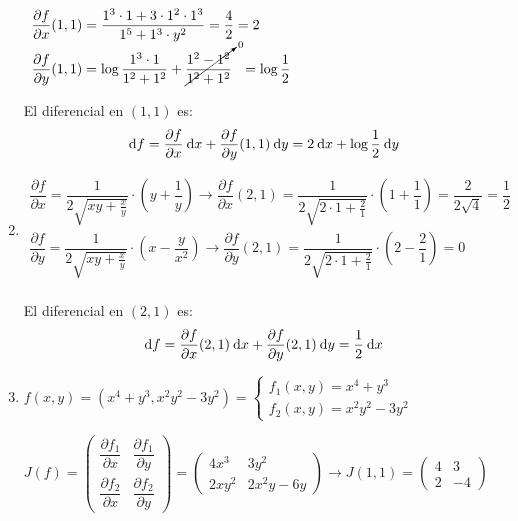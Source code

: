 \begin{enumerate}[label=\color{red}\textbf{\arabic*)}, leftmargin=*]
$\begin{array}{l}
\dfrac{\partial f}{\partial x}(1,1)=\dfrac{1^{3}\cdot1+3\cdot1^{2}\cdot1^{3}}{1^{5}+1^{3}\cdot y^{2}}=\dfrac{4}{2}=2\\
\dfrac{\partial f}{\partial y}(1,1)=\log\dfrac{1^{3}\cdot 1}{1^{2}+1^{2}}+\cancelto{0}{\dfrac{1^{2}-1^{2}}{1^{2}+1^{2}}}~~=\log\dfrac{1}{2}
\end{array}$

El diferencial en $(1,1)$ es: \[ \mathrm{d}f=\dfrac{\partial f}{\partial x}\:\mathrm{d}x+\dfrac{\partial f}{\partial y}(1,1)\:\mathrm{d}y=2\:\mathrm{d}x+\log\dfrac{1}{2}\:\mathrm{d}y \]

\item {}

$\begin{array}{l}
\dfrac{\partial f}{\partial x}=\dfrac{1}{2\sqrt{xy+\frac{x}{y}}}\cdot\left(y+\dfrac{1}{y}\right)\longrightarrow\dfrac{\partial f}{\partial x}(2,1)=\dfrac{1}{2\sqrt{2\cdot 1+\frac{2}{1}}}\cdot\left(1+\dfrac{1}{1}\right)=\dfrac{2}{2\sqrt{4}}=\dfrac{1}{2}\\
\dfrac{\partial f}{\partial y}=\dfrac{1}{2\sqrt{xy+\frac{x}{y}}}\cdot\left(x-\dfrac{y}{x^{2}}\right)\longrightarrow\dfrac{\partial f}{\partial y}(2,1)=\dfrac{1}{2\sqrt{2\cdot1+\frac{2}{1}}}\cdot\left(2-\dfrac{2}{1}\right)=0\\
\end{array}$

El diferencial en $(2,1)$ es: \[ \mathrm{d}f=\dfrac{\partial f}{\partial x}(2,1)\:\mathrm{d}x+\dfrac{\partial f}{\partial y}(2,1)\:\mathrm{d}y=\dfrac{1}{2}\:\mathrm{d}x \]

\item {}

$f(x,y)=\left(x^{4}+y^{3},x^{2}y^{2}-3y^{2}\right)=\begin{cases}
f_1(x,y)=x^{4}+y^{3}\\
f_2(x,y)=x^{2}y^{2}-3y^{2}
\end{cases}$

$J(f)=\begin{pmatrix}
\dfrac{\partial f_1}{\partial x} & \dfrac{\partial f_1}{\partial y} \\
\dfrac{\partial f_{2}}{\partial x} & \dfrac{\partial f_2}{\partial y}
\end{pmatrix}=\begin{pmatrix}
4x^{3} & 3y^2 \\
 2xy^{2} & 2x^{2}y-6y
\end{pmatrix}\longrightarrow J(1,1)=\begin{pmatrix}
4 & 3 \\
2 & -4
\end{pmatrix}$


\end{enumerate}
